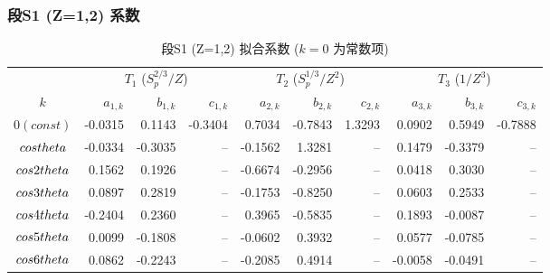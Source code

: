 \subsubsection*{段S1 (Z=1,2) 系数}
\begin{table}[h]
  \centering
  \caption{段S1 (Z=1,2) 拟合系数 ($k=0$ 为常数项)}
  \begin{tabular}{c|rrr|rrr|rrr}
    \hline
    \multicolumn{1}{c|}{} & \multicolumn{3}{c|}{$T_1$ ($S_p^{2/3}/Z$)} & \multicolumn{3}{c|}{$T_2$ ($S_p^{1/3}/Z^2$)} & \multicolumn{3}{c}{$T_3$ ($1/Z^3$)} \\
    $k$ & $a_{1,k}$ & $b_{1,k}$ & $c_{1,k}$ & $a_{2,k}$ & $b_{2,k}$ & $c_{2,k}$ & $a_{3,k}$ & $b_{3,k}$ & $c_{3,k}$ \\
    \hline
    $0 (const)$ & -0.0315 & 0.1143 & -0.3404 & 0.7034 & -0.7843 & 1.3293 & 0.0902 & 0.5949 & -0.7888 \\
    $\\cos\\theta$ & -0.0334 & -0.3035 & -- & -0.1562 & 1.3281 & -- & 0.1479 & -0.3379 & -- \\
    $\\cos2\\theta$ & 0.1562 & 0.1926 & -- & -0.6674 & -0.2956 & -- & 0.0418 & 0.3030 & -- \\
    $\\cos3\\theta$ & 0.0897 & 0.2819 & -- & -0.1753 & -0.8250 & -- & 0.0603 & 0.2533 & -- \\
    $\\cos4\\theta$ & -0.2404 & 0.2360 & -- & 0.3965 & -0.5835 & -- & 0.1893 & -0.0087 & -- \\
    $\\cos5\\theta$ & 0.0099 & -0.1808 & -- & -0.0602 & 0.3932 & -- & 0.0577 & -0.0785 & -- \\
    $\\cos6\\theta$ & 0.0862 & -0.2243 & -- & -0.2085 & 0.4914 & -- & -0.0058 & -0.0491 & -- \\
    \hline
  \end{tabular}
\end{table}

